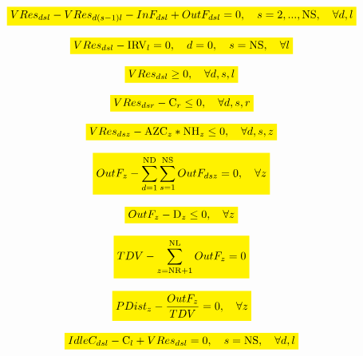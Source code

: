 \documentclass{singlecol}
\newcommand{\mathcolorbox}[2]{\colorbox{#1}{$\displaystyle #2$}}
\theoremstyle{TH}{
\newtheorem{lemma}{Lemma}
\newtheorem{theorem}[lemma]{Theorem}
\newtheorem{corrolary}[lemma]{Corrolary}
\newtheorem{conjecture}[lemma]{Conjecture}
\newtheorem{proposition}[lemma]{Proposition}
\newtheorem{claim}[lemma]{Claim}
\newtheorem{stheorem}[lemma]{Wrong Theorem}
\newtheorem{algorithm}{Algorithm}
}
\theoremstyle{THrm}{
\newtheorem{definition}{Definition}[section]
\newtheorem{question}{Question}[section]
\newtheorem{remark}{Remark}
\newtheorem{scheme}{Scheme}
}
\theoremstyle{THhit}{
\newtheorem{case}{Case}[section]
}
\begin{document}
\begin{equation}
	\mathcolorbox{yellow}{VRes_{dsl} - VRes_{d(s-1)l} - InF_{dsl} + OutF_{dsl} = 0, \quad s=2,...,\mathrm{NS}, \quad \forall{d,l}}
	\label{eq:volRem!T1}
\end{equation}

\begin{equation}
	\mathcolorbox{yellow}{VRes_{dsl} - \mathrm{IRV}_l = 0, \quad d = 0, \quad s = \mathrm{NS}, \quad \forall{l}}
	\label{eq:volRStart}
\end{equation}

\begin{equation}
	\mathcolorbox{yellow}{VRes_{dsl} \geq 0, \quad \forall{d,s,l}}
	\label{eq:minRV}
\end{equation}

\begin{equation}
	\mathcolorbox{yellow}{VRes_{dsr} - \mathrm{C}_{r} \leq 0, \quad \forall{d,s,r}}
	\label{eq:maxRV}
\end{equation}

\begin{equation}
	\mathcolorbox{yellow}{VRes_{dsz} - \mathrm{AZC}_z*\mathrm{NH}_z \leq 0, \quad \forall{d,s,z}}
	\label{eq:maxRZV}
\end{equation}

\begin{equation}
	\mathcolorbox{yellow}{OutF_{z} - \sum_{d=1}^{\mathrm{ND}}\sum_{s=1}^{\mathrm{NS}}{OutF_{dsz}} = 0, \quad \forall z}
	\label{eq:evalTOutFZone}
\end{equation}

\begin{equation}
	\mathcolorbox{yellow}{OutF_{z} -  \mathrm{D}_z  \leq 0,  \quad \forall z}
	\label{eq:demandRes}
\end{equation}

\begin{equation}
	\mathcolorbox{yellow}{TDV - \sum_{z=\mathrm{NR}+1}^{\mathrm{NL}}{OutF_{z}} = 0}
	\label{eq:evalTOutF}
\end{equation}

\begin{equation}
	\mathcolorbox{yellow}{PDist_{z} - \dfrac{OutF_{z}}{TDV} = 0, \quad \forall z}
	\label{eq:evalPDist}
\end{equation}

\begin{equation}
	\mathcolorbox{yellow}{IdleC_{dsl} - \mathrm{C}_{l} + VRes_{dsl} = 0, \quad s = \mathrm{NS}, \quad \forall{d, l}}
	\label{eq:evalIdleCap}
\end{equation}
\end{document}
